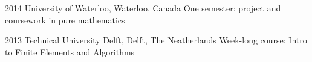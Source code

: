 

\begin{cvskills}

  \cvskill
    {2014} %
    {University of Waterloo, Waterloo, Canada} %
    {One semester: project and coursework in pure mathematics} %

  \cvskill
    {2013} %
    {Technical University Delft, Delft, The Neatherlands} %
    {Week-long course: Intro to Finite Elements and Algorithms} %


\end{cvskills}






